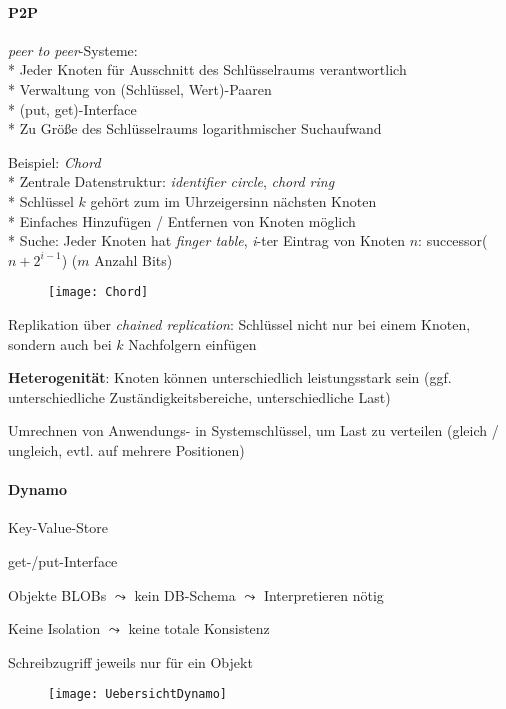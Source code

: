 \paragraph{P2P}
\begin{items}
	\item \emph{peer to peer}-Systeme:
		\\*
		Jeder Knoten für Ausschnitt des Schlüsselraums verantwortlich
		\\*
		Verwaltung von (Schlüssel, Wert)-Paaren
		\\*
		(put, get)-Interface
		\\*
		Zu Größe des Schlüsselraums logarithmischer Suchaufwand
	\item Beispiel: \emph{Chord} \\*
		Zentrale Datenstruktur: \emph{identifier circle}, \emph{chord ring}\\*
		Schlüssel $k$ gehört zum im Uhrzeigersinn nächsten Knoten\\*
		Einfaches Hinzufügen / Entfernen von Knoten möglich
		\\* Suche: Jeder Knoten hat \emph{finger table}, \emph{i}-ter Eintrag von Knoten \( n \): successor(\( n+2^{i-1} \)) (\( m \) Anzahl Bits)
	\begin{figure}[H]\centering\label{Chord}\texttt{[image: Chord]}\end{figure}
	\item Replikation über \emph{chained replication}: Schlüssel nicht nur bei einem Knoten, sondern auch bei \( k \) Nachfolgern einfügen
	\item \textbf{Heterogenität}: Knoten können unterschiedlich leistungsstark sein (ggf. unterschiedliche Zuständigkeitsbereiche, unterschiedliche Last)
	\item Umrechnen von Anwendungs- in Systemschlüssel, um Last zu verteilen (gleich / ungleich, evtl. auf mehrere Positionen)
\end{items}

\paragraph{Dynamo}
\begin{items}
	\item Key-Value-Store
	\item get-/put-Interface
	\item Objekte BLOBs \( \leadsto \) kein DB-Schema \( \leadsto \) Interpretieren nötig
	\item Keine Isolation \( \leadsto \) keine totale Konsistenz
	\item Schreibzugriff jeweils nur für ein Objekt
\end{items}
\begin{figure}[H]\centering\label{UebersichtDynamo}\texttt{[image: UebersichtDynamo]}\end{figure}

